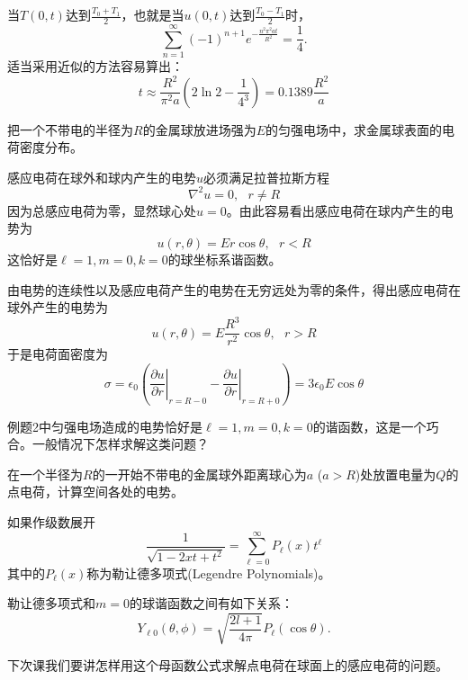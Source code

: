 \documentclass[CJK]{beamer}
\begin{document}
\begin{frame}
\bch
当$T(0,t)$达到$\frac{T_0+T_1}{2}$，也就是当$u(0,t)$达到$\frac{T_0-T_1}{2}$时，
$$\sum_{n=1}^\infty (-1)^{n+1} e^{-\frac{n^2\pi^2 at}{R^2}} = \frac{1}{4}.$$
适当采用近似的方法容易算出：
$$ t \approx \frac{R^2}{\pi^2a}\left(2\ln 2 - \frac{1}{4^3}\right) = 0.1389 \frac{R^2}{a} $$
\ech
\end{frame}



\begin{frame}
\bch


把一个不带电的半径为$R$的金属球放进场强为$E$的匀强电场中，求金属球表面的电荷密度分布。
\ech
\end{frame}


\begin{frame}
\bch

感应电荷在球外和球内产生的电势$u$必须满足拉普拉斯方程
$$\nabla^2 u = 0,\ \ \ r\ne R$$
因为总感应电荷为零，显然球心处$u=0$。由此容易看出感应电荷在球内产生的电势为
$$ u(r, \theta) = E r \cos\theta,\ \ \ r<R $$
这恰好是$\ell =1, m = 0, k=0$的球坐标系谐函数。

由电势的连续性以及感应电荷产生的电势在无穷远处为零的条件，得出感应电荷在球外产生的电势为
$$ u(r, \theta) = E \frac{R^3}{r^2}\cos\theta, \ \ \ r>R $$
于是电荷面密度为
$$\sigma =  \epsilon_0\left(\left.\frac{\partial u}{\partial r}\right\vert_{r=R-0}-\left.\frac{\partial u}{\partial r}\right\vert_{r=R+0}\right) = 3\epsilon_0E\cos\theta $$ 
\ech
\end{frame}



\begin{frame}
\bch


例题2中匀强电场造成的电势恰好是$\ell = 1, m = 0, k=0$的谐函数，这是一个巧合。一般情况下怎样求解这类问题？
\ech
\end{frame}



\begin{frame}
\bch
{}

在一个半径为$R$的一开始不带电的金属球外距离球心为$a$ ($a>R$)处放置电量为$Q$的点电荷，计算空间各处的电势。
\ech
\end{frame}


\begin{frame}
\bch
如果作级数展开
$$ \frac{1}{\sqrt{1-2xt+t^2}} = \sum_{\ell =0}^\infty P_\ell (x)t^\ell  $$
其中的{\blue $P_\ell(x)$称为勒让德多项式(Legendre Polynomials)}。

\skiplines

勒让德多项式和$m=0$的球谐函数之间有如下关系：
$$ Y_{\ell 0}(\theta, \phi) =\sqrt{\frac{2l+1}{4\pi}} P_{\ell}(\cos\theta). $$

\skipline
下次课我们要讲怎样用这个母函数公式求解点电荷在球面上的感应电荷的问题。
\ech
\end{frame}
\end{document}
